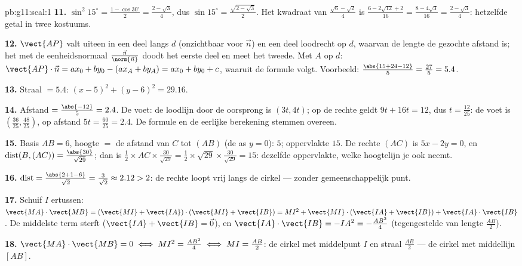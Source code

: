 \begin{solution}{pb:g11:scal:1}
\textbf{11.} $\sin^2 15^\circ = \frac{1 - \cos 30^\circ}{2} =
\frac{2 - \sqrt3}{4}$, dus $\sin 15^\circ = \frac{\sqrt{2 - \sqrt3}}{2}$.
Het kwadraat van $\frac{\sqrt6 - \sqrt2}{4}$ is
$\frac{6 - 2\sqrt{12} + 2}{16} = \frac{8 - 4\sqrt3}{16} =
\frac{2 - \sqrt3}{4}$: hetzelfde getal in twee kostuums.

\textbf{12.} $\vect{AP}$ valt uiteen in een deel langs $d$ (onzichtbaar voor
$\vec n$) en een deel loodrecht op $d$, waarvan de lengte de gezochte
afstand is; het  met de eenheidsnormaal
$\frac{\vec n}{\norm{\vec n}}$ doodt het eerste deel en meet het tweede. Met
$A$ op $d$: $\vect{AP} \cdot \vec n = a x_0 + b y_0 - (a x_A + b y_A) =
a x_0 + b y_0 + c$, waaruit de formule volgt. Voorbeeld:
$\frac{\abs{15 + 24 - 12}}{5} = \frac{27}{5} = 5.4$.

\textbf{13.} Straal $= 5.4$: $(x - 5)^2 + (y - 6)^2 = 29.16$.

\textbf{14.} Afstand $= \frac{\abs{-12}}{5} = 2.4$. De voet: de loodlijn
door de oorsprong is $(3t, 4t)$; op de rechte geldt $9t + 16t = 12$, dus
$t = \frac{12}{25}$: de voet is $\left(\frac{36}{25}, \frac{48}{25}\right)$,
op afstand $5t = \frac{60}{25} = 2.4$. De formule en de eerlijke berekening
stemmen overeen.

\textbf{15.} Basis $AB = 6$, hoogte $=$ de afstand van $C$ tot $(AB)$ (de as
$y = 0$): $5$; oppervlakte $15$. De rechte $(AC)$ is $5x - 2y = 0$, en
$\operatorname{dist}(B, (AC)) = \frac{\abs{30}}{\sqrt{29}}$; dan is
$\frac12 \times AC \times \frac{30}{\sqrt{29}} = \frac12 \times \sqrt{29}
\times \frac{30}{\sqrt{29}} = 15$: dezelfde oppervlakte, welke hoogtelijn je
ook neemt.

\textbf{16.} $\operatorname{dist} = \frac{\abs{2 + 1 - 6}}{\sqrt2} =
\frac{3}{\sqrt2} \approx 2.12 > 2$: de rechte loopt vrij langs de cirkel ---
zonder gemeenschappelijk punt.

\textbf{17.} Schuif $I$ ertussen:
$\vect{MA} \cdot \vect{MB} = (\vect{MI} + \vect{IA}) \cdot
(\vect{MI} + \vect{IB}) = MI^2 + \vect{MI} \cdot (\vect{IA} + \vect{IB}) +
\vect{IA} \cdot \vect{IB}$. De middelste term sterft
($\vect{IA} + \vect{IB} = \vec 0$), en
$\vect{IA} \cdot \vect{IB} = -IA^2 = -\frac{AB^2}{4}$ (tegengestelde
 van lengte $\frac{AB}2$).

\textbf{18.} $\vect{MA} \cdot \vect{MB} = 0 \iff MI^2 = \frac{AB^2}{4}
\iff MI = \frac{AB}{2}$: de cirkel met middelpunt $I$ en straal
$\frac{AB}2$ --- de cirkel met middellijn $[AB]$.


\end{solution}
